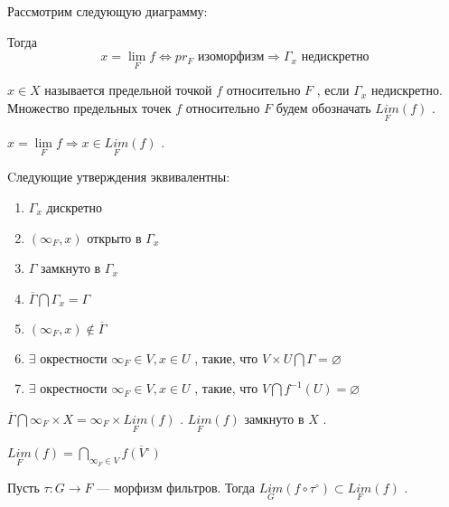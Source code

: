 \SSsect Рассмотрим следующую диаграмму:


Тогда
\[ x = \lim_{F} f \Leftrightarrow pr_F \mbox{~изоморфизм} \Rightarrow \Gamma_x \mbox{~недискретно} \]

\SSsect[def] \( x \in X \) называется предельной точкой \( f \) относительно \( F \) , если \( \Gamma_x \) недискретно. Множество предельных точек \( f \) относительно \( F \) будем обозначать \( \underset{F}{Lim}(f) \) .

\SSsect \( x = \lim\limits_{F} f \Rightarrow x \in \underset{F}{Lim}(f) \) .

\pagebreak

\SSsect Cледующие утверждения эквивалентны:

\begin{enumerate}[label={\alph*)}]
\item \( \Gamma_x \) дискретно 
\item \( (\infty_F,x) \) открыто в \( \Gamma_x \) 
\item \( \Gamma \) замкнуто в \( \Gamma_x \) 
\item \( \overline{\Gamma} \bigcap \Gamma_x = \Gamma \)  
\item \( (\infty_F,x) \notin \overline{\Gamma} \)  
\item \( \exists \) окрестности \( \infty_F \in V, x \in U\) , такие, что \( V \times U \bigcap \Gamma = \varnothing \) 
\item \( \exists \) окрестности \( \infty_F \in V, x \in U\) , такие, что \( V \bigcap f^{-1}(U) = \varnothing \)  
\end{enumerate}

\SSsect \( \overline{\Gamma} \bigcap \infty_F \times X = \infty_F \times \underset{F}{Lim}(f) \) .
\( \underset{F}{Lim}(f) \) замкнуто в \( X \) .

\SSsect \( \underset{F}{Lim}(f) = \bigcap\limits_{\infty_F \in V} \overline{f(V^\circ)} \)

\SSsect Пусть \( \tau : G \rightarrow F \) --- морфизм фильтров. Тогда \( \underset{G}{Lim}(f \circ \tau^\circ) \subset \underset{F}{Lim}(f) \) .

